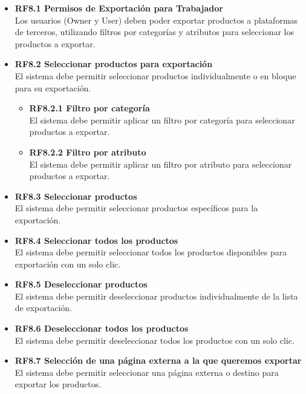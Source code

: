 \documentclass[12pt.a4paper]{article}
\begin{document}
\begin{itemize}
    \item \textbf{RF8.1 Permisos de Exportación para Trabajador} \\
    Los usuarios (Owner y User) deben poder exportar productos a plataformas de terceros, utilizando filtros por categorías y atributos para seleccionar los productos a exportar.

    \item \textbf{RF8.2 Seleccionar productos para exportación} \\
    El sistema debe permitir seleccionar productos individualmente o en bloque para su exportación.
    \begin{itemize}
        \item \textbf{RF8.2.1 Filtro por categoría} \\
        El sistema debe permitir aplicar un filtro por categoría para seleccionar productos a exportar.

        \item \textbf{RF8.2.2 Filtro por atributo} \\
        El sistema debe permitir aplicar un filtro por atributo para seleccionar productos a exportar.
    \end{itemize}

    \item \textbf{RF8.3 Seleccionar productos} \\
    El sistema debe permitir seleccionar productos específicos para la exportación.

    \item \textbf{RF8.4 Seleccionar todos los productos} \\
    El sistema debe permitir seleccionar todos los productos disponibles para exportación con un solo clic.

    \item \textbf{RF8.5 Deseleccionar productos} \\
    El sistema debe permitir deseleccionar productos individualmente de la lista de exportación.

    \item \textbf{RF8.6 Deseleccionar todos los productos} \\
    El sistema debe permitir deseleccionar todos los productos con un solo clic.

    \item \textbf{RF8.7 Selección de una página externa a la que queremos exportar} \\
    El sistema debe permitir seleccionar una página externa o destino para exportar los productos.


\end{itemize}
\end{document}
